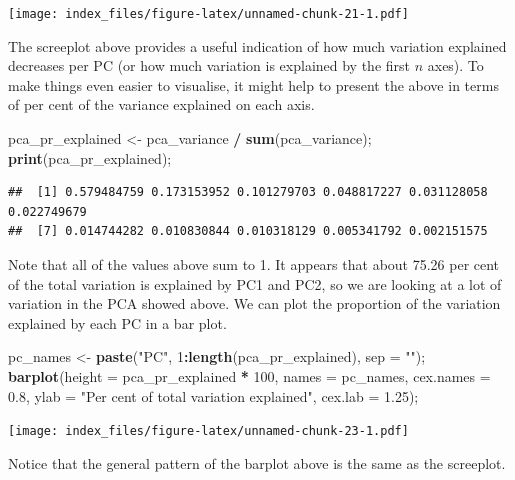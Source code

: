 \documentclass[]{article}
\newenvironment{Shaded}{\begin{snugshade}}{\end{snugshade}}
\newcommand{\DataTypeTok}[1]{\textcolor[rgb]{0.13,0.29,0.53}{#1}}
\newcommand{\DecValTok}[1]{\textcolor[rgb]{0.00,0.00,0.81}{#1}}
\newcommand{\FloatTok}[1]{\textcolor[rgb]{0.00,0.00,0.81}{#1}}
\newcommand{\KeywordTok}[1]{\textcolor[rgb]{0.13,0.29,0.53}{\textbf{#1}}}
\newcommand{\NormalTok}[1]{#1}
\newcommand{\OperatorTok}[1]{\textcolor[rgb]{0.81,0.36,0.00}{\textbf{#1}}}
\newcommand{\StringTok}[1]{\textcolor[rgb]{0.31,0.60,0.02}{#1}}
\begin{document}
\texttt{[image: index\_files/figure-latex/unnamed-chunk-21-1.pdf]}

The screeplot above provides a useful indication of how much variation
explained decreases per PC (or how much variation is explained by the
first \(n\) axes). To make things even easier to visualise, it might
help to present the above in terms of per cent of the variance explained
on each axis.

\begin{Shaded}
\begin{Highlighting}[]
\NormalTok{pca_pr_explained  <-}\StringTok{ }\NormalTok{pca_variance }\OperatorTok{/}\StringTok{ }\KeywordTok{sum}\NormalTok{(pca_variance);}
\KeywordTok{print}\NormalTok{(pca_pr_explained);}
\end{Highlighting}
\end{Shaded}

\begin{verbatim}
##  [1] 0.579484759 0.173153952 0.101279703 0.048817227 0.031128058 0.022749679
##  [7] 0.014744282 0.010830844 0.010318129 0.005341792 0.002151575
\end{verbatim}

Note that all of the values above sum to 1. It appears that about 75.26
per cent of the total variation is explained by PC1 and PC2, so we are
looking at a lot of variation in the PCA showed above. We can plot the
proportion of the variation explained by each PC in a bar plot.

\begin{Shaded}
\begin{Highlighting}[]
\NormalTok{pc_names <-}\StringTok{ }\KeywordTok{paste}\NormalTok{(}\StringTok{"PC"}\NormalTok{, }\DecValTok{1}\OperatorTok{:}\KeywordTok{length}\NormalTok{(pca_pr_explained), }\DataTypeTok{sep =} \StringTok{""}\NormalTok{);}
\KeywordTok{barplot}\NormalTok{(}\DataTypeTok{height =}\NormalTok{ pca_pr_explained }\OperatorTok{*}\StringTok{ }\DecValTok{100}\NormalTok{, }\DataTypeTok{names =}\NormalTok{ pc_names, }\DataTypeTok{cex.names =} \FloatTok{0.8}\NormalTok{,}
        \DataTypeTok{ylab =} \StringTok{"Per cent of total variation explained"}\NormalTok{, }\DataTypeTok{cex.lab =} \FloatTok{1.25}\NormalTok{);}
\end{Highlighting}
\end{Shaded}

\texttt{[image: index\_files/figure-latex/unnamed-chunk-23-1.pdf]}

Notice that the general pattern of the barplot above is the same as the
screeplot.
\end{document}
